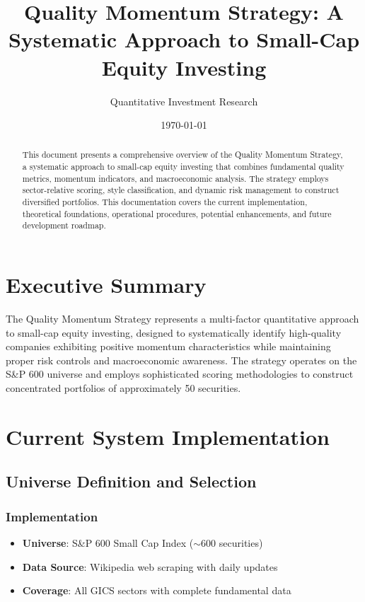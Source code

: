 \documentclass[12pt,a4paper]{article}
\title{\textbf{Quality Momentum Strategy: A Systematic Approach to Small-Cap Equity Investing}}
\author{Quantitative Investment Research}
\date{\today}
\begin{document}
\maketitle

\begin{abstract}
This document presents a comprehensive overview of the Quality Momentum Strategy, a systematic approach to small-cap equity investing that combines fundamental quality metrics, momentum indicators, and macroeconomic analysis. The strategy employs sector-relative scoring, style classification, and dynamic risk management to construct diversified portfolios. This documentation covers the current implementation, theoretical foundations, operational procedures, potential enhancements, and future development roadmap.
\end{abstract}

\tableofcontents
\newpage

\section{Executive Summary}

The Quality Momentum Strategy represents a multi-factor quantitative approach to small-cap equity investing, designed to systematically identify high-quality companies exhibiting positive momentum characteristics while maintaining proper risk controls and macroeconomic awareness. The strategy operates on the S\&P 600 universe and employs sophisticated scoring methodologies to construct concentrated portfolios of approximately 50 securities.

\section{Current System Implementation}

\subsection{Universe Definition and Selection}

\subsubsection{Implementation}
\begin{itemize}
    \item \textbf{Universe}: S\&P 600 Small Cap Index ($\sim$600 securities)
    \item \textbf{Data Source}: Wikipedia web scraping with daily updates
    \item \textbf{Coverage}: All GICS sectors with complete fundamental data
\end{itemize}
\end{document}
